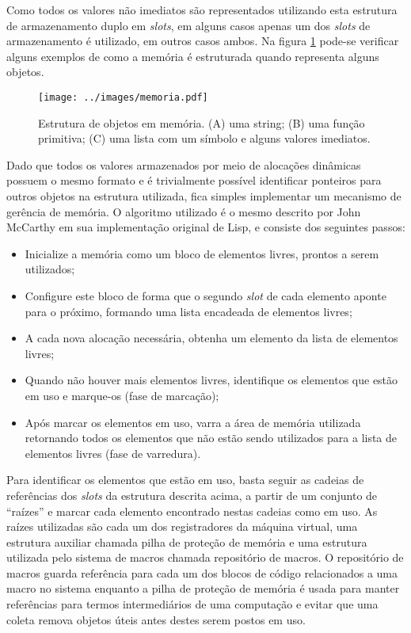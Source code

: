 Como todos os valores não imediatos são representados utilizando esta
estrutura de armazenamento duplo em \textit{slots}, em alguns casos apenas um dos \textit{slots}
de armazenamento é utilizado, em outros casos ambos. Na figura \ref{fig:memoria}
pode-se verificar alguns exemplos de como a memória é estruturada quando
representa alguns objetos.

\begin{figure}[h!]
\centering
\texttt{[image: ../images/memoria.pdf]}
\caption{Estrutura de objetos em memória. (A) uma string; (B) uma função
         primitiva; (C) uma lista com um símbolo e alguns valores imediatos.}
\label{fig:memoria}
\end{figure}

Dado que todos os valores armazenados por meio de alocações dinâmicas possuem o
mesmo formato e é trivialmente possível identificar ponteiros para outros
objetos na estrutura utilizada, fica simples implementar um mecanismo de
gerência de memória. O algoritmo utilizado é o mesmo descrito por John McCarthy
em sua implementação original de Lisp\cite{mccarthy:lisp}, e consiste dos seguintes passos:

\begin{itemize}

\item Inicialize a memória como um bloco de elementos livres, prontos a serem
utilizados;
 
\item Configure este bloco de forma que o segundo \textit{slot} de cada elemento aponte
para o próximo, formando uma lista encadeada de elementos livres;
 
\item A cada nova alocação necessária, obtenha um elemento da lista de
elementos livres;
 
\item Quando não houver mais elementos livres, identifique os elementos que
estão em uso e marque-os (fase de marcação);
 
\item Após marcar os elementos em uso, varra a área de memória utilizada
retornando todos os elementos que não estão sendo utilizados para a lista de
elementos livres (fase de varredura).

\end{itemize}

Para identificar os elementos que estão em uso, basta seguir as cadeias de
referências dos \textit{slots} da estrutura descrita acima, a partir de um
conjunto de ``raízes'' e marcar cada elemento encontrado nestas cadeias como em
uso. As raízes utilizadas são cada um dos registradores da máquina virtual, uma
estrutura auxiliar chamada pilha de proteção de memória e uma estrutura
utilizada pelo sistema de macros chamada repositório de macros. O repositório
de macros guarda referência para cada um dos blocos de código relacionados a
uma macro no sistema enquanto a pilha de proteção de memória é usada para
manter referências para termos intermediários de uma computação e evitar que
uma coleta remova objetos úteis antes destes serem postos em uso.

